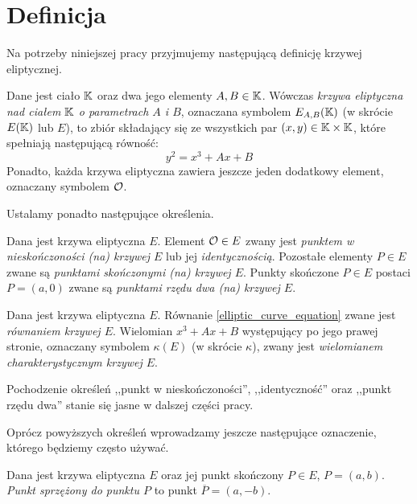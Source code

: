 \section{Definicja}

Na potrzeby niniejszej pracy przyjmujemy
następującą definicję krzywej eliptycznej.

\begin{definition}\label{elliptic_curve_definition}
Dane jest ciało $\mathbb{K}$ oraz dwa jego elementy $A, B \in \mathbb{K}$.
Wówczas \emph{krzywa eliptyczna nad ciałem $\mathbb{K}$ o parametrach $A$ i $B$},
oznaczana symbolem $E_{A,B}(\mathbb{K})$ (w skrócie $E(\mathbb{K})$ lub $E$),
to zbiór składający się
ze wszystkich par $(x, y) \in \mathbb{K} \times \mathbb{K}$,
które spełniają następującą równość:
\begin{equation}\label{elliptic_curve_equation}
y^2 = x^3 + Ax + B
\end{equation}
Ponadto, każda krzywa eliptyczna zawiera jeszcze jeden dodatkowy element,
oznaczany symbolem $\mathcal{O}$.
\end{definition}

Ustalamy ponadto następujące określenia.

\begin{definition}
Dana jest krzywa eliptyczna $E$.
Element $\mathcal{O} \in E$ zwany jest
\emph{punktem w nieskończoności (na) krzywej $E$} lub jej \emph{identycznością}.
Pozostałe elementy $P \in E$
zwane są \emph{punktami skończonymi (na) krzywej $E$}.
Punkty skończone $P \in E$ postaci $P = (a, 0)$
zwane są \emph{punktami rzędu dwa (na) krzywej $E$}.
\end{definition}

\begin{definition}
Dana jest krzywa eliptyczna $E$.
Równanie \ref{elliptic_curve_equation} zwane jest \emph{równaniem krzywej $E$}.
Wielomian $x^3 + Ax + B$ występujący po jego prawej stronie,
oznaczany symbolem $\kappa(E)$ (w skrócie $\kappa$),
zwany jest \emph{wielomianem charakterystycznym krzywej $E$}.
\end{definition}

Pochodzenie określeń
,,punkt w nieskończoności'', ,,identyczność'' oraz ,,punkt rzędu dwa''
stanie się jasne w dalszej części pracy.

Oprócz powyższych określeń
wprowadzamy jeszcze następujące oznaczenie,
którego będziemy często używać.

\begin{definition}
Dana jest krzywa eliptyczna $E$
oraz jej punkt skończony $P \in E$, $P = (a, b)$.
\emph{Punkt sprzężony do punktu $P$}
to punkt $\overline{P} = (a, -b)$.
\end{definition}

